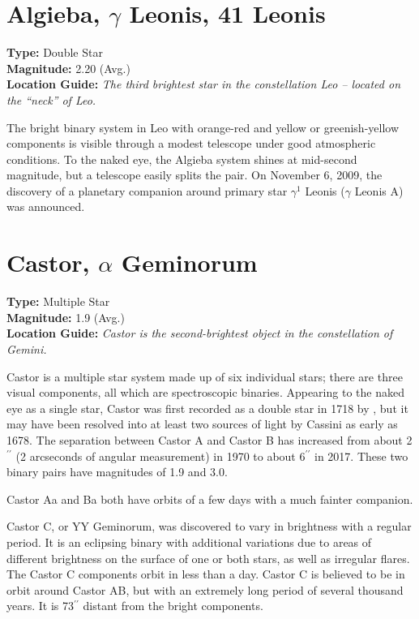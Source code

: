 \section{Algieba, \texorpdfstring{$\gamma$}{gamma} Leonis, 41 Leonis}
\textbf{Type:} Double Star \\
\textbf{Magnitude:} 2.20 (Avg.) \\
\textbf{Location Guide:} \textit{The third brightest star in the constellation Leo -- located on the ``neck'' of Leo.}

The bright binary system in Leo with orange-red and yellow or greenish-yellow components is visible through a modest telescope under good atmospheric conditions. To the naked eye, the Algieba system shines at mid-second magnitude, but a telescope easily splits the pair. On November 6, 2009, the discovery of a planetary companion around primary star $\gamma^1$ Leonis ($\gamma$ Leonis A) was announced.

\section{Castor, \texorpdfstring{$\alpha$}{alpha} Geminorum}
\textbf{Type:} Multiple Star \\
\textbf{Magnitude:} 1.9 (Avg.) \\
\textbf{Location Guide:} \textit{Castor is the second-brightest object in the constellation of Gemini.}

Castor is a multiple star system made up of six individual stars; there are three visual components, all which are spectroscopic binaries. Appearing to the naked eye as a single star, Castor was first recorded as a double star in 1718 by , but it may have been resolved into at least two sources of light by Cassini as early as 1678. The separation between Castor A and Castor B has increased from about 2$^{\prime\prime}$ (2 arcseconds of angular measurement) in 1970 to about 6$^{\prime\prime}$ in 2017. These two binary pairs have magnitudes of 1.9 and 3.0.

Castor Aa and Ba both have orbits of a few days with a much fainter companion.

Castor C, or YY Geminorum, was discovered to vary in brightness with a regular period. It is an eclipsing binary with additional variations due to areas of different brightness on the surface of one or both stars, as well as irregular flares. The Castor C components orbit in less than a day. Castor C is believed to be in orbit around Castor AB, but with an extremely long period of several thousand years. It is 73$^{\prime\prime}$ distant from the bright components.

